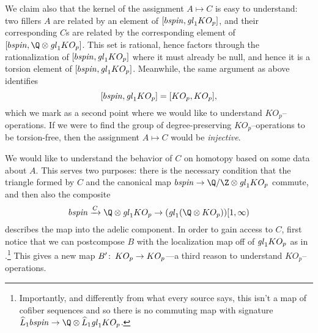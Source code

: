 We claim also that the kernel of the assignment \(A \mapsto C\) is easy to understand: two fillers \(A\) are related by an element of \([b\mathit{spin}, \mathit{gl}_1 KO_p]\), and their corresponding \(C\)s are related by the corresponding element of \([b\spin, \Q \otimes \gl_1 KO_p]\).  This set is rational, hence factors through the rationalization of \([b\mathit{spin}, \mathit{gl}_1 KO_p]\) where it must already be null, and hence it is a torsion element of \([b\mathit{spin}, \mathit{gl}_1 KO_p]\).  Meanwhile, the same argument as above identifies \[[b\mathit{spin}, \mathit{gl}_1 KO_p] = [KO_p, KO_p],\] which we mark as a second point where we would like to understand \(KO_p\)--operations.  If we were to find the group of degree-preserving \(KO_p\)--operations to be torsion-free, then the assignment \(A \mapsto C\) would be \emph{injective}.

We would like to understand the behavior of \(C\) on homotopy based on some data about \(A\).  This serves two purposes: there is the necessary condition that the triangle formed by \(C\) and the canonical map \(b\spin \to \Q / \Z \otimes \gl_1 KO_p\) commute, and then also the composite \[b\spin \xrightarrow{C} \Q \otimes \gl_1 KO_p \to (\gl_1 (\Q \otimes KO_p))[1, \infty)\] describes the map into the adelic component.  In order to gain access to \(C\), first notice that we can postcompose \(B\) with the localization map off of \(\mathit{gl}_1 KO_p\) as in .\footnote{Importantly, and differently from what every source says, this isn't a map of cofiber sequences and so there is no commuting map with signature \(\widehat L_1 b\spin \to \Q \otimes \widehat L_1 \gl_1 KO_p\).}  This gives a new map \(B'\colon\thinspace KO_p \to KO_p\)---a third reason to understand \(KO_p\)--operations.

